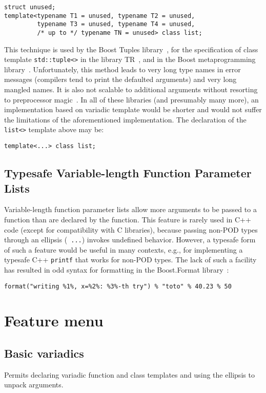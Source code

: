 \documentclass{article}
\begin{document}
\begin{verbatim}
struct unused;
template<typename T1 = unused, typename T2 = unused, 
         typename T3 = unused, typename T4 = unused, 
         /* up to */ typename TN = unused> class list;
\end{verbatim}

This technique is used by the Boost Tuples library~\cite{Tuples01},
for the specification of class template {\tt std::tuple<>} in the
library TR~\cite{Jarvi02}, and in the Boost metaprogramming
library~\cite{Gurtovoy02}. Unfortunately, this method leads to very
long type names in error messages (compilers tend to print the
defaulted arguments) and very long mangled names. It is also not
scalable to additional arguments without resorting to preprocessor
magic~\cite{Preprocessor01}. In all of these libraries (and presumably
many more), an implementation based on variadic template would be
shorter and would not suffer the limitations of the aforementioned
implementation. The declaration of the {\tt list<>} template above may
be:
\begin{verbatim}
template<...> class list;
\end{verbatim}

\subsection{Typesafe Variable-length Function Parameter Lists}
Variable-length function parameter lists allow more arguments to be
passed to a function than are declared by the function. This feature
is rarely used in C++ code (except for compatibility with C
libraries), because passing non-POD types through an ellipsis ({\tt
  ...}) invokes undefined behavior. However, a typesafe form of such a
feature would be useful in many contexts, e.g., for implementing a
typesafe C++ {\tt printf} that works for non-POD types. The lack of
such a facility has resulted in odd syntax for formatting in the
Boost.Format library~\cite{Krempp02}:
\begin{verbatim}
format("writing %1%, x=%2%: %3%-th try") % "toto" % 40.23 % 50
\end{verbatim}

\section{Feature menu}
\subsection{Basic variadics}
Permits declaring variadic function and class templates and using the
ellipsis to unpack arguments.
\end{document}
